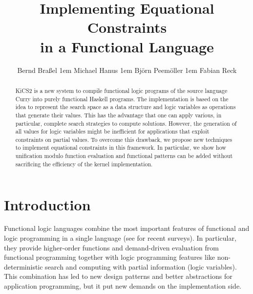 \documentclass{llncs}
\begin{document}
\pagestyle{plain}
\sloppy

\title{Implementing Equational Constraints\\ in a Functional Language}

\author{
Bernd Bra{\ss}el
\kern1em
Michael Hanus
\kern1em
Bj{\"o}rn Peem{\"o}ller
\kern1em
Fabian Reck
}

\maketitle

\begin{abstract}
KiCS2 is a new system
to compile functional logic programs of the source language Curry
into purely functional Haskell programs.
The implementation is based on the idea to represent
the search space as a data structure and logic variables
as operations that generate their values.
This has the advantage that one can apply various,
in particular, complete search strategies to compute solutions.
However, the generation of all values for logic variables
might be inefficient for applications that
exploit constraints on partial values.
To overcome this drawback, we propose new techniques
to implement equational constraints in this framework.
In particular, we show how unification modulo function evaluation
and functional patterns can be added without sacrificing
the efficiency of the kernel implementation.
\end{abstract}


\section{Introduction}
\label{sec:Introduction}

Functional logic languages combine the most important
features of functional and logic programming in a single language
(see \cite{AntoyHanus10CACM,Hanus07ICLP} for recent surveys).
In particular, they provide higher-order functions and demand-driven
evaluation from functional programming together with logic programming features
like non-deterministic search and computing with partial information
(logic variables).
This combination
has led to new design patterns \cite{AntoyHanus02FLOPS,AntoyHanus11WFLP}
and better abstractions for application programming,
but it put new demands on the implementation side.
\end{document}
